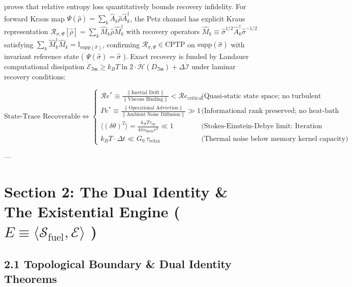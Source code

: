 \documentclass[11pt,a4paper]{article}
\theoremstyle{definition}
\theoremstyle{remark}
\begin{document}
proves that relative entropy loss quantitatively bounds recovery infidelity. For forward Kraus map $\Psi(\hat{\rho}) = \sum_k \hat{A}_k \hat{\rho} \hat{A}_k^\dagger$, the Petz channel has explicit Kraus representation $\mathcal{R}_{\sigma, \Psi}[\hat{\rho}] = \sum_k \hat{M}_k \hat{\rho} \hat{M}_k^\dagger$ with recovery operators $\hat{M}_k \equiv \hat{\sigma}^{1/2} \hat{A}_k^\dagger \hat{\sigma}^{-1/2}$ satisfying $\sum_k \hat{M}_k^\dagger \hat{M}_k = \mathbb{I}_{\mathrm{supp}(\hat{\sigma})}$, confirming $\mathcal{R}_{\sigma, \Psi} \in \mathrm{CPTP}$ on $\mathrm{supp}(\hat{\sigma})$ with invariant reference state ( $\Psi(\hat{\sigma}) = \hat{\sigma}$ ). Exact recovery is funded by Landauer computational dissipation $\dot{\mathcal{E}}_{\mathfrak{Im}} \ge k_B T \ln 2 \cdot \dot{\mathcal{H}}(D_{\mathfrak{Im}}) + \Delta \dot{\mathcal{I}}$ under laminar recovery conditions:


\begin{equation}
\text{State-Trace Recoverable} \iff \begin{cases}
\mathcal{R}e^* \equiv \frac{\|\text{Inertial Drift}\|}{\|\text{Viscous Binding}\|} < \mathcal{R}e_{\text{critical}} & \text{(Quasi-static state space; no turbulent scrambling)} \\
Pe^* \equiv \frac{\|\text{Operational Advection}\|}{\|\text{Ambient Noise Diffusion}\|} \gg 1 & \text{(Informational rank preserved; no heat-bath bleed)} \\
\langle(\delta\theta)^2\rangle = \frac{k_B T \tau_{\text{op}}}{4 \pi \nu_{\text{shear}} r^3} \ll 1 & \text{(Stokes-Einstein-Debye limit: Iteration outpaces thermal decoherence)} \\
k_B T \cdot \Delta t \ll G_0 \, \tau_{\text{relax}} & \text{(Thermal noise below memory kernel capacity)}
\end{cases}
\end{equation}


---

\section{Section 2: The Dual Identity \& The Existential Engine ( $E \equiv \langle \mathcal{S}_{\text{fuel}}, \mathcal{E} \rangle$ )}

\subsection{2.1 Topological Boundary \& Dual Identity Theorems}
\end{document}
